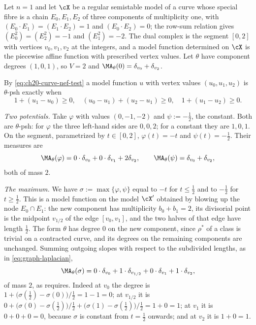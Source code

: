 \begin{example}
\label{ex:ch24-locality-check}
Let $n=1$ and let $\cX$ be a regular semistable model of a curve whose
special fibre is a chain $E_0,E_1,E_2$ of three components of
multiplicity one, with $(E_0\cdot E_1)=(E_1\cdot E_2)=1$ and
$(E_0\cdot E_2)=0$; the row-sum relation gives
$(E_0^2)=(E_2^2)=-1$ and $(E_1^2)=-2$.  The dual complex is the segment
$[0,2]$ with vertices $v_0,v_1,v_2$ at the integers, and a model
function determined on $\cX$ is the piecewise affine function with
prescribed vertex values.  Let $\theta$ have component degrees
$(1,0,1)$, so $V=2$ and $\MA_\theta(0)=\delta_{v_0}+\delta_{v_2}$.

By \eqref{eq:ch20-curve-nef-test} a model function $u$ with vertex values
$(u_0,u_1,u_2)$ is $\theta$-psh exactly when
\[
 1+(u_1-u_0)\geq0,
 \quad
 (u_0-u_1)+(u_2-u_1)\geq0,
 \quad
 1+(u_1-u_2)\geq0 .
\]

\emph{Two potentials.}  Take $\varphi$ with values $(0,-1,-2)$ and
$\psi:=-\tfrac12$, the constant.  Both are $\theta$-psh: for
$\varphi$ the three left-hand sides are $0,0,2$; for a constant they are
$1,0,1$.  On the segment, parametrized by $t\in[0,2]$,
$\varphi(t)=-t$ and $\psi(t)=-\tfrac12$.  Their measures are
\[
 \MA_\theta(\varphi)=0\cdot\delta_{v_0}+0\cdot\delta_{v_1}+2\delta_{v_2},
 \qquad
 \MA_\theta(\psi)=\delta_{v_0}+\delta_{v_2},
\]
both of mass $2$.

\emph{The maximum.}  We have
$\sigma:=\max\{\varphi,\psi\}$ equal to $-t$ for $t\leq\tfrac12$ and to
$-\tfrac12$ for $t\geq\tfrac12$.  This is a model function on the model
$\cX'$ obtained by blowing up the node $E_0\cap E_1$: the new component
has multiplicity $b_0+b_1=2$, its divisorial point is the midpoint
$v_{1/2}$ of the edge $[v_0,v_1]$, and the two halves of that edge have
length $\tfrac12$.  The form $\theta$ has degree $0$ on the new
component, since $\rho^*$ of a class is trivial on a contracted curve, and
its degrees on the remaining components are unchanged.  Summing outgoing
slopes with respect to the subdivided lengths, as in
\eqref{eq:graph-laplacian},
\[
 \MA_\theta(\sigma)
 =0\cdot\delta_{v_0}+1\cdot\delta_{v_{1/2}}
  +0\cdot\delta_{v_1}+1\cdot\delta_{v_2},
\]
of mass $2$, as  requires.  Indeed at $v_0$ the
degree is $1+\bigl(\sigma(\tfrac12)-\sigma(0)\bigr)/\tfrac12=1-1=0$; at
$v_{1/2}$ it is
$0+\bigl(\sigma(0)-\sigma(\tfrac12)\bigr)/\tfrac12
 +\bigl(\sigma(1)-\sigma(\tfrac12)\bigr)/\tfrac12=1+0=1$; at $v_1$ it is
$0+0+0=0$, because $\sigma$ is constant from $t=\tfrac12$ onwards; and
at $v_2$ it is $1+0=1$.


\end{example}
